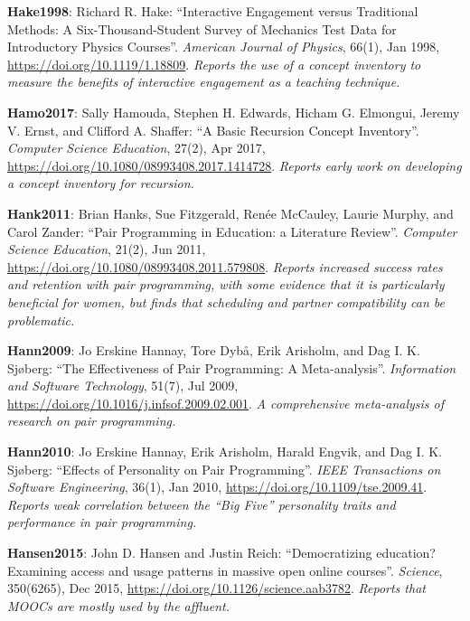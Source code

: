 \textbf{\hypertarget{b:Hake1998}{Hake1998}\label{b:Hake1998}}: Richard R. Hake: ``Interactive Engagement versus Traditional Methods: A Six-Thousand-Student Survey of Mechanics Test Data for Introductory Physics Courses''. \emph{American Journal of Physics}, 66(1), Jan 1998, \url{https://doi.org/10.1119/1.18809}. \emph{Reports the use of a concept inventory to measure the benefits of interactive engagement as a teaching technique.}

\textbf{\hypertarget{b:Hamo2017}{Hamo2017}\label{b:Hamo2017}}: Sally Hamouda, Stephen H. Edwards, Hicham G. Elmongui, Jeremy V. Ernst, and Clifford A. Shaffer: ``A Basic Recursion Concept Inventory''. \emph{Computer Science Education}, 27(2), Apr 2017, \url{https://doi.org/10.1080/08993408.2017.1414728}. \emph{Reports early work on developing a concept inventory for recursion.}

\textbf{\hypertarget{b:Hank2011}{Hank2011}\label{b:Hank2011}}: Brian Hanks, Sue Fitzgerald, Renée McCauley, Laurie Murphy, and Carol Zander: ``Pair Programming in Education: a Literature Review''. \emph{Computer Science Education}, 21(2), Jun 2011, \url{https://doi.org/10.1080/08993408.2011.579808}. \emph{Reports increased success rates and retention with pair programming, with some evidence that it is particularly beneficial for women, but finds that scheduling and partner compatibility can be problematic.}

\textbf{\hypertarget{b:Hann2009}{Hann2009}\label{b:Hann2009}}: Jo Erskine Hannay, Tore Dybå, Erik Arisholm, and Dag I. K. Sjøberg: ``The Effectiveness of Pair Programming: A Meta-analysis''. \emph{Information and Software Technology}, 51(7), Jul 2009, \url{https://doi.org/10.1016/j.infsof.2009.02.001}. \emph{A comprehensive meta-analysis of research on pair programming.}

\textbf{\hypertarget{b:Hann2010}{Hann2010}\label{b:Hann2010}}: Jo Erskine Hannay, Erik Arisholm, Harald Engvik, and Dag I. K. Sjøberg: ``Effects of Personality on Pair Programming''. \emph{IEEE Transactions on Software Engineering}, 36(1), Jan 2010, \url{https://doi.org/10.1109/tse.2009.41}. \emph{Reports weak correlation between the ``Big Five'' personality traits and performance in pair programming.}

\textbf{\hypertarget{b:Hansen2015}{Hansen2015}\label{b:Hansen2015}}: John D. Hansen and Justin Reich: ``Democratizing education? Examining access and usage patterns in massive open online courses''. \emph{Science}, 350(6265), Dec 2015, \url{https://doi.org/10.1126/science.aab3782}. \emph{Reports that MOOCs are mostly used by the affluent.}

